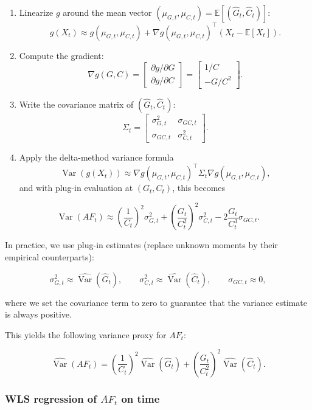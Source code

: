 \documentclass[
  12pt,
  letterpaper,
  DIV=11,
  numbers=noendperiod]{scrartcl}
\begin{document}
\begin{enumerate}
\def\labelenumi{\arabic{enumi}.}
\item
  Linearize \(g\) around the mean vector
  \((\mu_{G,t},\mu_{C,t})=\mathbb E[(\hat{G}_t,\hat C_t)]\): \[
  g(X_t)\approx g(\mu_{G,t},\mu_{C,t})+\nabla g(\mu_{G,t},\mu_{C,t})^\top (X_t-\mathbb E[X_t]).
  \]
\item
  Compute the gradient: \[
  \nabla g(G,C)=
  \begin{bmatrix}
  \partial g/\partial G\\
  \partial g/\partial C
  \end{bmatrix}
  =
  \begin{bmatrix}
  1/C\\
  -G/C^2
  \end{bmatrix}.
  \]
\item
  Write the covariance matrix of \((\hat{G}_t,\hat C_t)\): \[
  \Sigma_t=
  \begin{bmatrix}
  \sigma_{G,t}^2 & \sigma_{GC,t}\\
  \sigma_{GC,t} & \sigma_{C,t}^2
  \end{bmatrix}.
  \]
\item
  Apply the delta-method variance formula \[
  \operatorname{Var}(g(X_t))\approx \nabla g(\mu_{G,t},\mu_{C,t})^\top\Sigma_t\nabla g(\mu_{G,t},\mu_{C,t}),
  \] and with plug-in evaluation at \((G_t,C_t)\), this becomes
\end{enumerate}

\[
\operatorname{Var}(AF_t)\approx\left(\frac{1}{C_t}\right)^2 \sigma_{G,t}^2+\left(\frac{G_t}{C_t^2}\right)^2 \sigma_{C,t}^2-2\frac{G_t}{C_t^3}\sigma_{GC,t}.
\]

In practice, we use plug-in estimates (replace unknown moments by their
empirical counterparts):

\[
\sigma^2_{G,t} \approx \widehat{\operatorname{Var}}(\hat{G}_t),\qquad \sigma^2_{C,t} \approx \widehat{\operatorname{Var}}(\hat C_t),\qquad \sigma_{GC,t} \approx 0,
\]

where we set the covariance term to zero to guarantee that the variance
estimate is always positive.

This yields the following variance proxy for \(AF_t\):

\[
\widehat{\operatorname{Var}}(AF_t) = \left(\frac{1}{C_t}\right)^2 \widehat{\operatorname{Var}}(\hat{G}_t) + \left(\frac{G_t}{C_t^2}\right)^2 \widehat{\operatorname{Var}}(\hat C_t).
\]

\subsubsection*{\texorpdfstring{WLS regression of \(AF_t\) on
time}{WLS regression of AF\_t on time}}\label{wls-regression-of-af_t-on-time}
\end{document}
